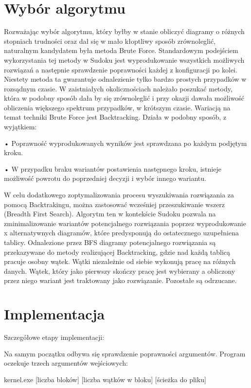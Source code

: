 \documentclass[a4paper,12pt]{article}
\begin{document}
\section{Wybór algorytmu}
Rozważając wybór algorytmu, który byłby w stanie obliczyć diagramy o różnych stopniach trudności oraz dał się w mało kłoptliwy sposób zrównoleglić, naturalnym kandydatem była metoda Brute Force. Standardowym podejściem wykorzystania tej metody w Sudoku jest wyprodukowanie wszystkich możliwych rozwiązań a następnie sprawdzenie poprawności każdej z konfiguracji po kolei. Niestety metoda ta gwarantuje odnalezienie tylko bardzo prostych przypadków w rozsądnym czasie. W zaistniałych okolicznościach należało poszukać metody, która w podobny sposób dała by się zrównoleglić i przy okazji dawała możliwość obliczenia większego spektrum przypadków, w krótszym czasie.
Wariacją na temat techniki Brute Force jest Backtracking. Działa w podobny sposób, z wyjątkiem:

•	Poprawność wyprodukowanych wyników jest sprawdzana po każdym podjętym kroku.

•	W przypadku braku wariantów postawienia następnego kroku, istnieje możliwość powrotu do     poprzedniej decyzji i wybór innego wariantu.

W celu dodatkowego zoptymalizowania procesu wyszukiwania rozwiązania za pomocą Backtrakingu, można zastosować wcześniej przeszukiwanie wszerz (Breadth First Search).
Algorytm ten w kontekście Sudoku pozwala na zminimalizowanie wariantów potencjalnego rozwiązania poprzez wyprodukowanie x alternatywnych diagramów, które predysponują do ostatecznego uzupełniena tablicy. Odnalezione przez BFS diagramy potencjalnego rozwiązania są przekazywane do metody realizującej Backtracking, gdzie nad każdą tablicą pracuje osobny wątek. Wątki niezależnie od siebie wykonują pracę na różnych danych. Wątek, który jako pierwszy skończy pracę jest wybierany a obliczony przez niego wariant jest traktowany jako rozwiązanie. Pozostałe są odrzucane.

\section{Implementacja}

Szczegółowe etapy implementacji:

Na samym początku odbywa się sprawdzenie poprawności argumentów. Program oczekuje trzech argumentów wejściowych:

kernel.exe [liczba bloków] [liczba wątków w bloku] [ścieżka do pliku]
\end{document}
